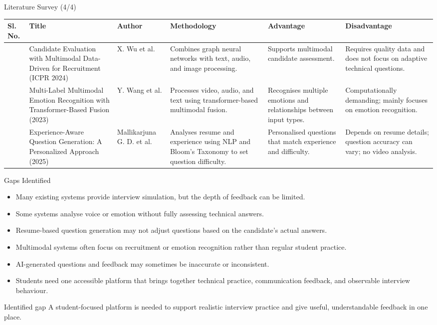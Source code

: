 \documentclass[aspectratio=169,11pt]{beamer}
\newcommand{\litrow}[6]{#1 & #2 & #3 & #4 & #5 & #6\\\hline}
\begin{document}
\begin{frame}{Literature Survey (4/4)}
\scriptsize
\setlength{\tabcolsep}{3pt}
\renewcommand{\arraystretch}{1.15}
\begin{tabularx}{\textwidth}{|>{\centering\arraybackslash}p{}|p{}|p{}|Y|Y|Y|}
\hline
\textbf{Sl. No.} & \textbf{Title} & \textbf{Author} & \textbf{Methodology} & \textbf{Advantage} & \textbf{Disadvantage}\\
\hline
\litrow{10}{Candidate Evaluation with Multimodal Data-Driven for Recruitment (ICPR 2024)}{X. Wu et al.}{Combines graph neural networks with text, audio, and image processing.}{Supports multimodal candidate assessment.}{Requires quality data and does not focus on adaptive technical questions.}
\litrow{11}{Multi-Label Multimodal Emotion Recognition with Transformer-Based Fusion (2023)}{Y. Wang et al.}{Processes video, audio, and text using transformer-based multimodal fusion.}{Recognises multiple emotions and relationships between input types.}{Computationally demanding; mainly focuses on emotion recognition.}
\litrow{12}{Experience-Aware Question Generation: A Personalized Approach (2025)}{Mallikarjuna G. D. et al.}{Analyses resume and experience using NLP and Bloom's Taxonomy to set question difficulty.}{Personalised questions that match experience and difficulty.}{Depends on resume details; question accuracy can vary; no video analysis.}
\end{tabularx}
\vspace{0.08cm}
\end{frame}

\begin{frame}{Gaps Identified}
\begin{itemize}
  \item Many existing systems provide interview simulation, but the depth of feedback can be limited.
  \item Some systems analyse voice or emotion without fully assessing technical answers.
  \item Resume-based question generation may not adjust questions based on the candidate's actual answers.
  \item Multimodal systems often focus on recruitment or emotion recognition rather than regular student practice.
  \item AI-generated questions and feedback may sometimes be inaccurate or inconsistent.
  \item Students need one accessible platform that brings together technical practice, communication feedback, and observable interview behaviour.
\end{itemize}
\vspace{0.1cm}
\begin{block}{Identified gap}
A student-focused platform is needed to support realistic interview practice and give useful, understandable feedback in one place.
\end{block}
\end{frame}
\end{document}
